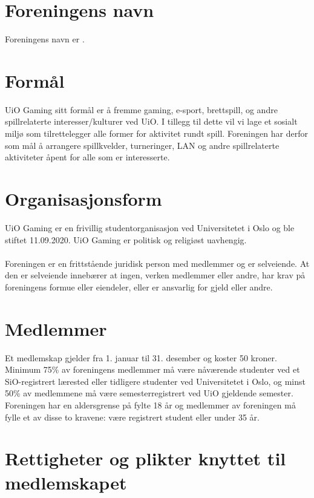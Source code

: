\documentclass[12pt,a4paper,norsk]{article}
\begin{document}
\section{Foreningens navn}
Foreningens navn er .


\section{Formål}

UiO Gaming sitt formål er å fremme gaming, e-sport, brettspill, og andre spillrelaterte interesser/kulturer ved UiO. I tillegg til dette vil vi lage et sosialt miljø som tilrettelegger alle former for aktivitet rundt spill. Foreningen har derfor som mål å arrangere spillkvelder, turneringer, LAN og andre spillrelaterte aktiviteter åpent for alle som er interesserte.



\section{Organisasjonsform}

UiO Gaming er en frivillig studentorganisasjon ved Universitetet i Oslo og ble stiftet 11.09.2020. UiO Gaming er politisk og religiøst uavhengig.
\\
\\
Foreningen er en frittstående juridisk person med medlemmer og er selveiende. At den er selveiende innebærer at ingen, verken medlemmer eller andre, har krav på foreningens formue eller eiendeler, eller er ansvarlig for gjeld eller andre.



\section{Medlemmer}

Et medlemskap gjelder fra 1. januar til 31. desember og koster 50 kroner. Minimum 75\% av foreningens medlemmer må være nåværende studenter ved et SiO-registrert lærested eller tidligere studenter ved Universitetet i Oslo, og minst 50\% av medlemmene må være semesterregistrert ved UiO gjeldende semester. Foreningen har en aldersgrense på fylte 18 år og medlemmer av foreningen må fylle et av disse to kravene: være registrert student eller under 35 år.



\section{Rettigheter og plikter knyttet til medlemskapet}
\end{document}
